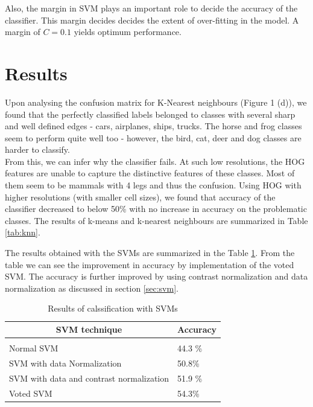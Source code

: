 \documentclass{article} %
\begin{document}
Also, the margin in SVM plays an important role to decide the accuracy of the classifier. This margin decides decides the extent of over-fitting in the model. A margin of $C=0.1$ yields optimum performance.

\section{Results} %
\label{sub:Results}
    Upon analysing the confusion matrix for K-Nearest neighbours (Figure 1 (d)), we found that the perfectly classified labels belonged to classes with several sharp and well defined edges - cars, airplanes, ships, trucks. The horse and frog classes seem to perform quite well too - however, the bird, cat, deer and dog classes are harder to classify.\\

        From this, we can infer why the classifier fails. At such low resolutions, the HOG features are unable to capture the distinctive features of these classes. Most of them seem to be mammals with 4 legs and thus the confusion. Using HOG with higher resolutions (with smaller cell sizes), we found that accuracy of the classifier decreased to below 50\% with no increase in accuracy on the problematic classes. The results of k-means and k-nearest neighbours are summarized in Table \ref{tab:knn}.
        
        The results obtained with the SVMs are summarized in the Table \ref{tab:svm}. From the table we can see the improvement in accuracy by implementation of the voted SVM. The accuracy is further improved by using contrast normalization and data normalization as discussed in section \ref{sec:svm}.
        
    
    
    


\begin{table}[t]
    \begin{center}
        \begin{tabular}{ll}
        \multicolumn{1}{c}{\bf SVM technique}  &\multicolumn{1}{c}{\bf Accuracy}
        \\ \hline \\
        Normal SVM         & 44.3 \% \\
        SVM with data Normalization             & 50.8\% \\
        SVM with data and contrast normalization &51.9 \% \\
        Voted SVM	& 54.3\% \\
        \end{tabular}
    \end{center}
    \caption{Results of calssification with SVMs}
    \label{tab:svm}
\end{table}
\end{document}
